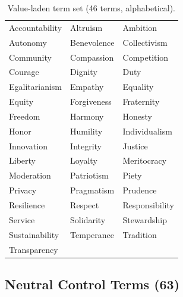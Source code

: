 \documentclass[11pt, letterpaper]{article}
\begin{document}
\begin{table}[H]
  \centering
  \footnotesize
  \begin{tabular}{p{}p{}p{}}
    Accountability & Altruism & Ambition \\
    Autonomy & Benevolence & Collectivism \\
    Community & Compassion & Competition \\
    Courage & Dignity & Duty \\
    Egalitarianism & Empathy & Equality \\
    Equity & Forgiveness & Fraternity \\
    Freedom & Harmony & Honesty \\
    Honor & Humility & Individualism \\
    Innovation & Integrity & Justice \\
    Liberty & Loyalty & Meritocracy \\
    Moderation & Patriotism & Piety \\
    Privacy & Pragmatism & Prudence \\
    Resilience & Respect & Responsibility \\
    Service & Solidarity & Stewardship \\
    Sustainability & Temperance & Tradition \\
    Transparency & & \\
  \end{tabular}
  \caption{Value-laden term set (46 terms, alphabetical).}
  \label{tab:terms_value}
\end{table}

\subsection{Neutral Control Terms (63)}
\end{document}
